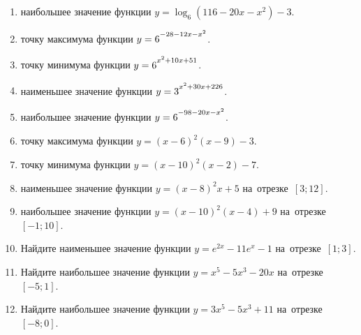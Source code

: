 \documentclass[a4paper,10pt]{article}
\begin{document}
\begin{enumerate}
\item {} наибольшее значение функции $y=\log_6\left(116-20x-x^2\right)-3$.

\item {} точку максимума функции $y=6\strut^{-28-12x-x^2}$.

\item {} точку минимума функции $y=6\strut^{x^2+10x+51}$.

\item {} наименьшее значение функции $y=3\strut^{x^2+30x+226}$.

\item {} наибольшее значение функции $y=6\strut^{-98-20x-x^2}$.

\item {} точку максимума функции $y=\left(x-6\right)^2\left(x-9\right)-3$.

\item {} точку минимума функции $y=\left(x-10\right)^2\left(x-2\right)-7$.

\item {} наименьшее значение функции $y=\left(x-8\right)^2x+5$ на~отрезке~$\left[3;12\right]$.

\item {} наибольшее значение функции $y=\left(x-10\right)^2\left(x-4\right)+9$ на~отрезке~$\left[-1;10\right]$.

\item Найдите наименьшее значение функции $y=e^{2x}-11e^x-1$ на~отрезке~$\left[1;3\right]$.

\item Найдите наибольшее значение функции $y=x^5-5x^3-20x$ на~отрезке~$\left[-5;1\right]$.

\item Найдите наибольшее значение функции $y=3x^5-5x^3+11$ на~отрезке~$\left[-8;0\right]$.

\end{enumerate}
\end{document}
